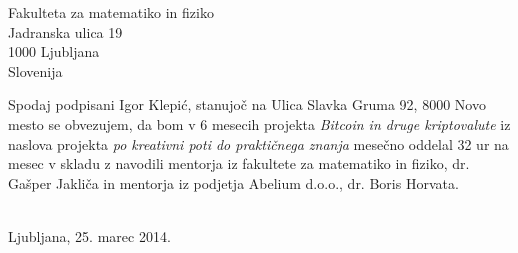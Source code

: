 \documentclass[a4paper]{scrlttr2}
\begin{document}
 
\begin{letter}{Fakulteta za matematiko in fiziko \\ Jadranska ulica 19 \\ 1000 Ljubljana \\ Slovenija}
 

\opening{}
Spodaj podpisani Igor Klepić, stanujoč na Ulica Slavka Gruma 92, 8000 Novo mesto se obvezujem, da bom v 6 mesecih projekta \textit{Bitcoin in druge kriptovalute} iz naslova projekta \textit{po kreativni poti do praktičnega znanja} mesečno oddelal 32 ur na mesec v skladu z navodili mentorja iz fakultete za matematiko in fiziko, dr. Gašper Jakliča in mentorja iz podjetja Abelium d.o.o., dr. Boris Horvata.
\\
\\

\closing{Ljubljana, 25. marec 2014.}


 
\end{letter}
 
\end{document}
